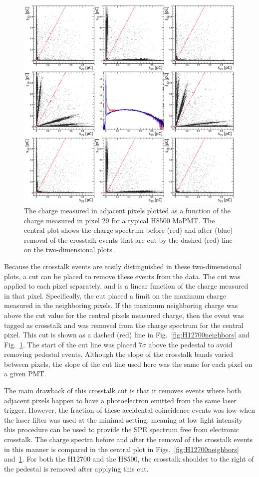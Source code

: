 \begin{figure}[h!bt]
    \centering
	\includegraphics[width=0.9\linewidth]{figures/H8500_ct_updated.png}
	\caption{The charge measured in adjacent pixels plotted as a function of the charge measured in pixel 29 for a typical H8500 MaPMT. The central plot shows the charge spectrum before (red) and after (blue) removal of the crosstalk events that are cut by the dashed (red) line on the two-dimensional plots.}
	\label{fig:H8500neighbors}
\end{figure}

Because the crosstalk events are easily distinguished in these two-dimensional plots, a cut can be placed to remove these events from the data. The cut was applied to each pixel separately, and is a linear function of the charge measured in that pixel. Specifically, the cut placed a limit on the maximum charge measured in the neighboring pixels. If the maximum neighboring charge was above the cut value for the central pixel\textquotesingle s measured charge, then the event was tagged as crosstalk and was removed from the charge spectrum for the central pixel. This cut is shown as a dashed (red) line in Fig.~\ref{fig:H12700neighbors} and Fig.~\ref{fig:H8500neighbors}. The start of the cut line was placed 7$\sigma$ above the pedestal to avoid removing pedestal events. Although the slope of the crosstalk bands varied between pixels, the slope of the cut line used here was the same for each pixel on a given PMT. 

The main drawback of this crosstalk cut is that it removes events where both adjacent pixels  happen to have a photoelectron emitted from the same laser trigger. However, the fraction of these accidental coincidence events was low when the laser filter was used at the minimal setting, meaning at low light intensity this procedure can be used to provide the SPE spectrum free from electronic crosstalk. The charge spectra before and after the removal of the crosstalk events in this manner is compared in the central plot in Figs.~\ref{fig:H12700neighbors} and~\ref{fig:H8500neighbors}. For both the H12700 and the H8500, the crosstalk shoulder to the right of the pedestal is removed after applying this cut. 
